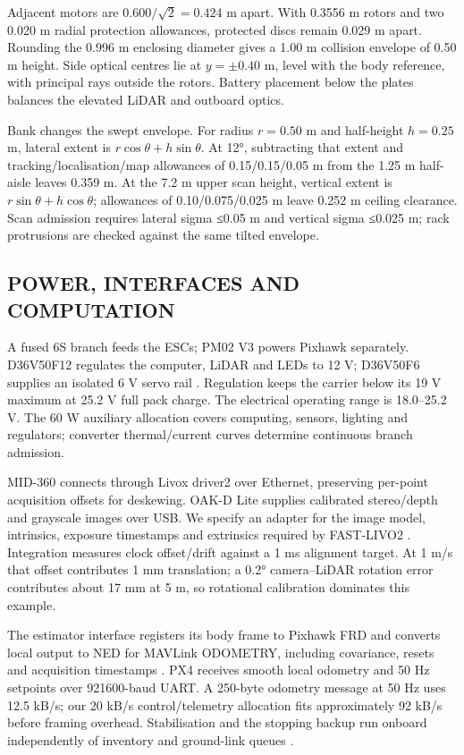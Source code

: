 \documentclass[a4paper,11pt]{article}
\begin{document}
Adjacent motors are $0.600/\sqrt{2}=0.424$ m apart. With 0.3556 m rotors and two 0.020 m radial protection allowances, protected discs remain 0.029 m apart. Rounding the 0.996 m enclosing diameter gives a 1.00 m collision envelope of 0.50 m height. Side optical centres lie at $y=\pm0.40$ m, level with the body reference, with principal rays outside the rotors. Battery placement below the plates balances the elevated LiDAR and outboard optics.

Bank changes the swept envelope. For radius $r=0.50$ m and half-height $h=0.25$ m, lateral extent is $r\cos\theta+h\sin\theta$. At 12°, subtracting that extent and tracking/localisation/map allowances of 0.15/0.15/0.05 m from the 1.25 m half-aisle leaves 0.359 m. At the 7.2 m upper scan height, vertical extent is $r\sin\theta+h\cos\theta$; allowances of 0.10/0.075/0.025 m leave 0.252 m ceiling clearance. Scan admission requires lateral sigma ≤0.05 m and vertical sigma ≤0.025 m; rack protrusions are checked against the same tilted envelope.

\subsection{P{\fontsize{9.2}{14}\selectfont OWER}, {\fontsize{9.2}{14}\selectfont INTERFACES} {\fontsize{9.2}{14}\selectfont AND} {\fontsize{9.2}{14}\selectfont COMPUTATION}}
A fused 6S branch feeds the ESCs; PM02 V3 powers Pixhawk separately. D36V50F12 regulates the computer, LiDAR and LEDs to 12 V; D36V50F6 supplies an isolated 6 V servo rail \cite{r11,r33,r34}. Regulation keeps the carrier below its 19 V maximum at 25.2 V full pack charge. The electrical operating range is 18.0–25.2 V. The 60 W auxiliary allocation covers computing, sensors, lighting and regulators; converter thermal/current curves determine continuous branch admission.

MID-360 connects through Livox driver2 over Ethernet, preserving per-point acquisition offsets for deskewing. OAK-D Lite supplies calibrated stereo/depth and grayscale images over USB. We specify an adapter for the image model, intrinsics, exposure timestamps and extrinsics required by FAST-LIVO2 \cite{r21,r43}. Integration measures clock offset/drift against a 1 ms alignment target. At 1 m/s that offset contributes 1 mm translation; a 0.2° camera–LiDAR rotation error contributes about 17 mm at 5 m, so rotational calibration dominates this example.

The estimator interface registers its body frame to Pixhawk FRD and converts local output to NED for MAVLink ODOMETRY, including covariance, resets and acquisition timestamps \cite{r23}. PX4 receives smooth local odometry and 50 Hz setpoints over 921600-baud UART. A 250-byte odometry message at 50 Hz uses 12.5 kB/s; our 20 kB/s control/telemetry allocation fits approximately 92 kB/s before framing overhead. Stabilisation and the stopping backup run onboard independently of inventory and ground-link queues \cite{r24}.
\end{document}
